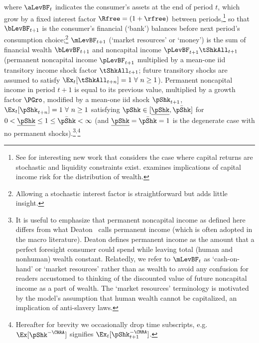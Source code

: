 \documentclass[BufferStockTheory]{subfiles}
\begin{document}
 where $\aLevBF_{t}$ indicates the consumer's assets at the end of period $t$, which grow by a fixed interest factor $\Rfree =(1+\rfree)$ between periods,\footnote{See \cite{mstCapIncFluct} for interesting new work that considers the case where capital returns are stochastic and liquidity constraints exist.  \cite{benhabibWealth} examines implications of capital income risk for the distribution of wealth.}  so that $\bLevBF_{t+1}$ is the consumer's financial (`bank') balances before next period's consumption choice;\footnote{Allowing a stochastic interest factor is straightforward but adds little insight.%
} $\mLevBF_{t+1}$ (`market resources' or `money') is the sum of financial wealth $\bLevBF_{t+1}$ and noncapital income $\pLevBF_{t+1}\tShkAll_{t+1}$ (permanent noncapital income $\pLevBF_{t+1}$ multiplied by a mean-one iid transitory income shock factor $\tShkAll_{t+1}$; future transitory shocks are assumed to satisfy $\Ex_{t}[{\tShkAll}_{t+n}]=1~\forall~n\geq 1$). Permanent noncapital income in period $t+1$ is equal to its previous value, multiplied by a growth factor $\PGro$, modified by a mean-one iid shock $\pShk_{t+1}$, $\Ex_{t}[{\pShk}_{t+n}]=1~\forall~n \geq 1$ satisfying $\pShk \in [\underline{\pShk},\bar{\pShk}]$ for $0 < \underline{\pShk} \leq 1 \leq \bar{\pShk} < \infty$ (and $\underline{\pShk}=\bar{\pShk}=1$ is the degenerate case with no permanent shocks).\footnote{It is useful to emphasize that permanent noncapital income as defined here differs from what Deaton~\citeyearpar{deatonUnderstandingC} calls permanent income (which is often adopted in the macro literature).  Deaton defines permanent income as the amount that a perfect foresight consumer could spend while leaving total (human and nonhuman) wealth constant.  Relatedly, we refer to $\mLevBF_{t}$ as `cash-on-hand' or `market resources' rather than as wealth to avoid any confusion for readers accustomed to thinking of the discounted value of future noncapital income as a part of wealth.  The `market resources' terminology is motivated by the model's assumption that human wealth cannot be capitalized, an implication of anti-slavery laws.}$^{,}$\footnote{Hereafter for brevity we occasionally drop time subscripts, e.g.\ $\Ex[\pShk^{-\CRRA}]$ signifies $\Ex_{t}[\pShk_{t+1}^{-\CRRA}]$.}

\end{document}
